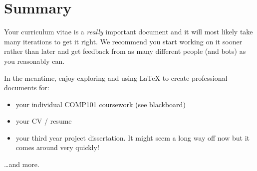 \documentclass[
]{book}
\providecommand{\tightlist}{%
  \setlength{\itemsep}{0pt}\setlength{\parskip}{0pt}}
\begin{document}
\hypertarget{cvconc}{%
\section{Summary}\label{cvconc}}

Your curriculum vitae is a \emph{really} important document and it will most likely take many iterations to get it right. We recommend you start working on it sooner rather than later and get feedback from as many different people (and bots) as you reasonably can.

In the meantime, enjoy exploring and using LaTeX to create professional documents for:

\begin{itemize}
\tightlist
\item
  your individual COMP101 coursework (see blackboard)
\item
  your CV / resume
\item
  your third year project dissertation. It might seem a long way off now but it comes around very quickly!
\end{itemize}

\ldots and more.

  
\end{document}
